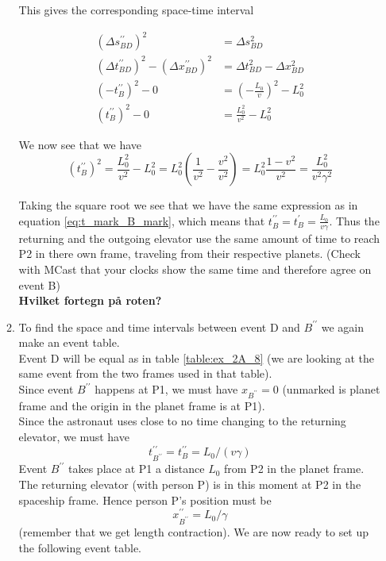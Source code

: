 \documentclass[a4paper,10pt,english]{article}
\begin{document}
\begin{enumerate}
\begin{enumerate}
This gives the corresponding space-time interval

\begin{align*}
(\Delta s^{\prime\prime}_{BD})^{2}&=\Delta s_{BD}^{2}\\
(\Delta t^{\prime\prime}_{BD})^{2}-(\Delta x^{\prime\prime}_{BD})^{2}&=\Delta t_{BD}^{2}-\Delta x_{BD}^{2}\\
(-t_{B}^{\prime\prime})^{2}-0&=\left(-\frac{L_{0}}{v}\right)^{2}-L_{0}^{2}\\
(t_{B}^{\prime\prime})^{2}-0&=\frac{L_{0}^{2}}{v^{2}}-L_{0}^{2}
\end{align*}

We now see that we have \[(t_{B}^{\prime\prime})^{2}=\frac{L_{0}^{2}}{v^{2}}-L_{0}^{2}=L_{0}^{2}\left(\frac{1}{v^{2}}-\frac{v^{2}}{v^{2}}\right)=L_{0}^{2}\frac{1-v^{2}}{v^{2}}=\frac{L_{0}^{2}}{v^{2}\gamma^{2}}\]

Taking the square root we see that we have the same expression as in equation \ref{eq:t_mark_B_mark}, which means that $t_{B}^{\prime\prime}=t_{B}^{\prime}=\frac{L_{0}}{v\gamma}$. Thus the returning and the outgoing elevator use the same amount of time to reach P2 in there own frame, traveling from their respective planets. (Check with MCast that your clocks show the same time and therefore agree on event B)
\\
\textbf{Hvilket fortegn på roten?}

\item To find the space and time intervals between event D and $B^{\prime\prime}$ we again make an event table.
\\
Event D will be equal as in table \ref{table:ex_2A_8} (we are looking at the same event from the two frames used in that table). \\
Since event $B^{\prime\prime}$ happens at P1, we must have $x_{B^{\prime\prime}}=0$ (unmarked is planet frame and the origin in the planet frame is at P1).\\
Since the astronaut uses close to no time changing to the returning elevator, we must have \[t^{\prime\prime}_{B^{\prime\prime}}=t^{\prime\prime}_{B}=L_{0}/(v\gamma)\]
Event $B^{\prime\prime}$ takes place at P1 a distance $L_{0}$ from P2 in the planet frame. The returning elevator (with person P) is in this moment at P2 in the spaceship frame. Hence person P's position must be \[x^{\prime\prime}_{B^{\prime\prime}}=L_{0}/\gamma\] (remember that we get length contraction).
We are now ready to set up the following event table.


\end{enumerate}
\end{enumerate}
\end{document}
